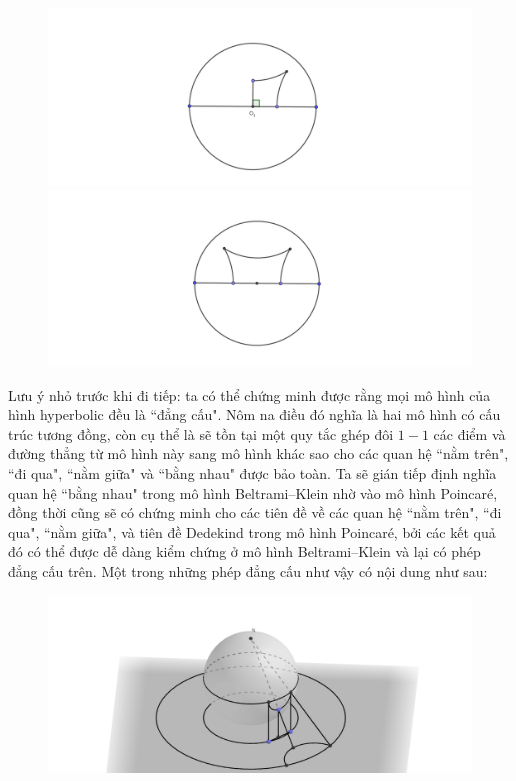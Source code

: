 \begin{multicols}{2}
\begin{figure}[H]
		\includegraphics[width= 1\linewidth]{Tứ giác Lambert.pdf}
		\includegraphics[width= 1\linewidth]{Tứ giác Saccheri.pdf}
		\vspace*{-10pt}
	\end{figure}	
	Lưu ý nhỏ trước khi đi tiếp: ta có thể chứng minh được rằng mọi mô hình của hình hyperbolic đều là ``đẳng cấu". Nôm na điều đó nghĩa là hai mô hình có cấu trúc tương đồng, còn cụ thể là sẽ tồn tại một quy tắc ghép đôi $1-1$ các điểm và đường thẳng từ mô hình này sang mô hình khác sao cho các quan hệ ``nằm trên", ``đi qua", ``nằm giữa" và ``bằng nhau" được bảo toàn. Ta sẽ gián tiếp định nghĩa quan hệ ``bằng nhau" trong mô hình Beltrami--Klein nhờ vào mô hình Poincaré, đồng thời cũng sẽ có chứng minh cho các tiên đề về các quan hệ ``nằm trên", ``đi qua", ``nằm giữa", và tiên đề Dedekind trong mô hình Poincaré, bởi các kết quả đó có thể được dễ dàng kiểm chứng ở mô hình Beltrami--Klein và lại có phép đẳng cấu trên. Một trong những phép đẳng cấu như vậy có nội dung như sau:
	\begin{figure}[H]
		\vspace*{-5pt}
		\centering
		\captionsetup{labelformat= empty, justification=centering}
		\includegraphics[width= 1\linewidth]{Klein sang Poincare.png}

\end{figure}
\end{multicols}
